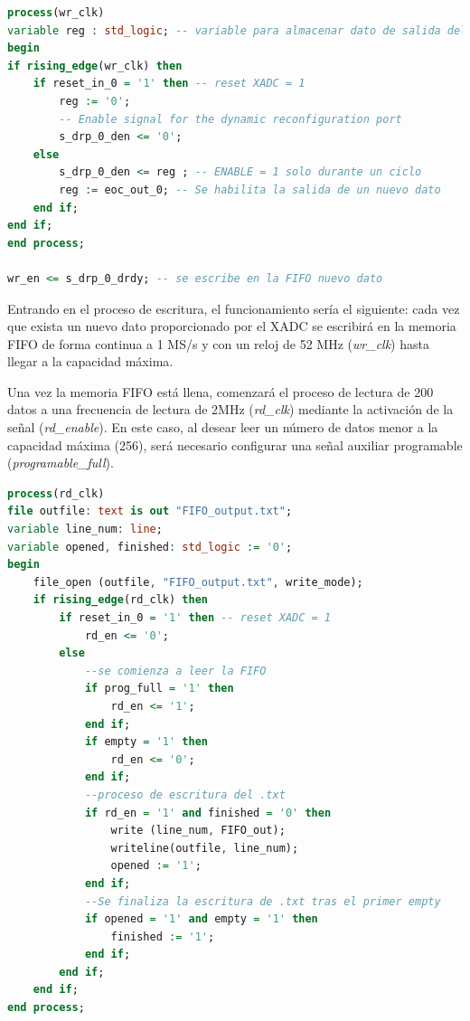 \vspace{5mm}

\begin{lstlisting}[language=VHDL, style=mystyle, caption={Proceso de escritura}]
process(wr_clk) 
variable reg : std_logic; -- variable para almacenar dato de salida del xadc
begin
if rising_edge(wr_clk) then
    if reset_in_0 = '1' then -- reset XADC = 1
        reg := '0';
        -- Enable signal for the dynamic reconfiguration port
        s_drp_0_den <= '0'; 
    else
        s_drp_0_den <= reg ; -- ENABLE = 1 solo durante un ciclo
        reg := eoc_out_0; -- Se habilita la salida de un nuevo dato 
    end if;
end if;
end process; 

wr_en <= s_drp_0_drdy; -- se escribe en la FIFO nuevo dato 
\end{lstlisting}

\vspace{3mm}

\pagebreak

Entrando en el proceso de escritura, el funcionamiento sería el siguiente: cada vez que exista un nuevo dato proporcionado por el XADC se escribirá en la memoria FIFO de forma continua a 1 MS/s y con un reloj de 52 MHz (\textit{wr\_clk}) hasta llegar a la capacidad máxima.

Una vez la memoria FIFO está llena, comenzará el proceso de lectura de 200 datos a una frecuencia de lectura de 2MHz (\textit{rd\_clk}) mediante la activación de la señal (\textit{rd\_enable}). En este caso, al desear leer un número de datos menor a la capacidad máxima (256), será necesario configurar una señal auxiliar programable (\textit{programable\_full}).

\vspace{5mm}

\begin{lstlisting}[language=VHDL, style=mystyle, caption={Proceso de lectura}]
process(rd_clk) 
file outfile: text is out "FIFO_output.txt"; 
variable line_num: line;
variable opened, finished: std_logic := '0'; 
begin
    file_open (outfile, "FIFO_output.txt", write_mode); 
    if rising_edge(rd_clk) then
        if reset_in_0 = '1' then -- reset XADC = 1
            rd_en <= '0';
        else
            --se comienza a leer la FIFO 
            if prog_full = '1' then 
                rd_en <= '1';
            end if; 
            if empty = '1' then  
                rd_en <= '0';
            end if;
            --proceso de escritura del .txt
            if rd_en = '1' and finished = '0' then 
                write (line_num, FIFO_out);
                writeline(outfile, line_num);
                opened := '1';
            end if;
            --Se finaliza la escritura de .txt tras el primer empty
            if opened = '1' and empty = '1' then 
                finished := '1';
            end if;
        end if;
    end if;
end process;   
\end{lstlisting}

